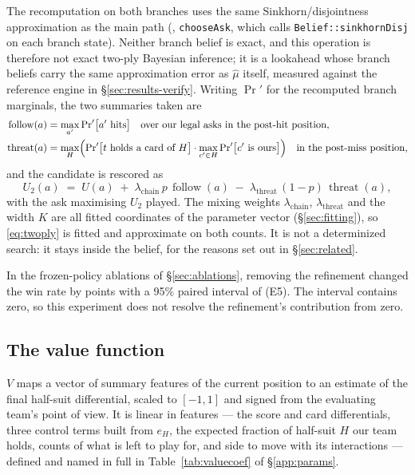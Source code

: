 The recomputation on both branches uses the same Sinkhorn/disjointness
approximation as the main path (, \texttt{chooseAsk},
which calls \texttt{Belief::sinkhornDisj} on each branch state). Neither branch
belief is exact, and this operation is therefore not exact two-ply Bayesian
inference; it is a lookahead whose branch beliefs carry the same approximation
error as $\hat\mu$ itself, measured against the reference engine in
\S\ref{sec:results-verify}. Writing $\Pr'$ for the recomputed branch marginals,
the two summaries taken are
\begin{align*}
  \operatorname{follow}(a) &= \max_{a'} \Pr\nolimits'\bigl[a' \text{ hits}\bigr]
    \quad \text{over our legal asks in the post-hit position,} \\
  \operatorname{threat}(a) &= \max_{H} \Bigl( \Pr\nolimits'\bigl[t \text{ holds a card of } H\bigr]\cdot
        \max_{c' \in H} \Pr\nolimits'\bigl[c' \text{ is ours}\bigr] \Bigr)
    \quad \text{in the post-miss position,}
\end{align*}
and the candidate is rescored as
\begin{equation}
  U_2(a) \;=\; U(a) \;+\; \lambda_{\mathrm{chain}}\, p\,\operatorname{follow}(a)
       \;-\; \lambda_{\mathrm{threat}}\,(1-p)\,\operatorname{threat}(a),
  \label{eq:twoply}
\end{equation}
with the ask maximising $U_2$ played. The mixing weights
$\lambda_{\mathrm{chain}}$, $\lambda_{\mathrm{threat}}$ and the width $K$ are
all fitted coordinates of the parameter vector (\S\ref{sec:fitting}), so
\eqref{eq:twoply} is fitted and approximate on both counts. It is not a
determinized search: it stays inside the belief, for the reasons set out in
\S\ref{sec:related}.

In the frozen-policy ablations of \S\ref{sec:ablations}, removing the refinement
changed the win rate by \numAblTwoPly{} points with a 95\% paired interval of
\numAblTwoPlyCI{} (E5). The interval contains zero, so this experiment does not
resolve the refinement's contribution from zero.

\subsection{The value function}
\label{sec:value}

$V$ maps a vector of summary features of the current position to an estimate
of the final half-suit differential, scaled to $[-1,1]$ and signed from the
evaluating team's point of view. It is linear in \numValueFeats{} features ---
the score and card differentials, three control terms built from $e_H$, the
expected fraction of half-suit $H$ our team holds, counts of what is left to
play for, and side to move with its interactions --- defined and named in full
in Table~\ref{tab:valuecoef} of \S\ref{app:params}.

